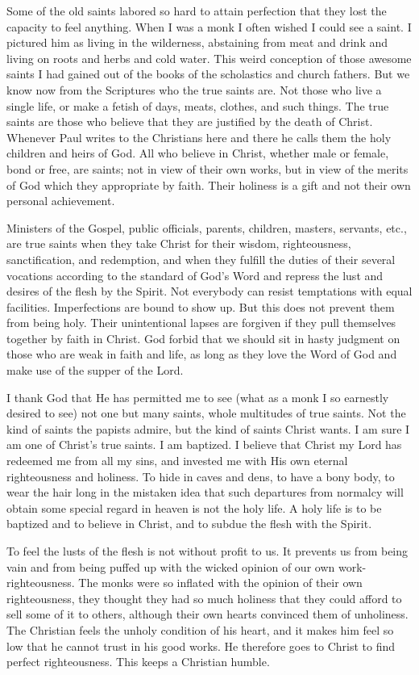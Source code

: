 Some of the old saints labored so hard to attain perfection that they lost the capacity to feel anything. When I was a monk I often wished I could see a saint. I pictured him as living in the wilderness, abstaining from meat and drink and living on roots and herbs and cold water. This weird conception of those awesome saints I had gained out of the books of the scholastics and church fathers. But we know now from the Scriptures who the true saints are. Not those who live a single life, or make a fetish of days, meats, clothes, and such things. The true saints are those who believe that they are justified by the death of Christ. Whenever Paul writes to the Christians here and there he calls them the holy children and heirs of God. All who believe in Christ, whether male or female, bond or free, are saints; not in view of their own works, but in view of the merits of God which they appropriate by faith. Their holiness is a gift and not their own personal achievement.

Ministers of the Gospel, public officials, parents, children, masters, servants, etc., are true saints when they take Christ for their wisdom, righteousness, sanctification, and redemption, and when they fulfill the duties of their several vocations according to the standard of God’s Word and repress the lust and desires of the flesh by the Spirit. Not everybody can resist temptations with equal facilities. Imperfections are bound to show up. But this does not prevent them from being holy. Their unintentional lapses are forgiven if they pull themselves together by faith in Christ. God forbid that we should sit in hasty judgment on those who are weak in faith and life, as long as they love the Word of God and make use of the supper of the Lord.

I thank God that He has permitted me to see (what as a monk I so earnestly desired to see) not one but many saints, whole multitudes of true saints. Not the kind of saints the papists admire, but the kind of saints Christ wants. I am sure I am one of Christ’s true saints. I am baptized. I believe that Christ my Lord has redeemed me from all my sins, and invested me with His own eternal righteousness and holiness. To hide in caves and dens, to have a bony body, to wear the hair long in the mistaken idea that such departures from normalcy will obtain some special regard in heaven is not the holy life. A holy life is to be baptized and to believe in Christ, and to subdue the flesh with the Spirit.

To feel the lusts of the flesh is not without profit to us. It prevents us from being vain and from being puffed up with the wicked opinion of our own work-righteousness. The monks were so inflated with the opinion of their own righteousness, they thought they had so much holiness that they could afford to sell some of it to others, although their own hearts convinced them of unholiness. The Christian feels the unholy condition of his heart, and it makes him feel so low that he cannot trust in his good works. He therefore goes to Christ to find perfect righteousness. This keeps a Christian humble.


